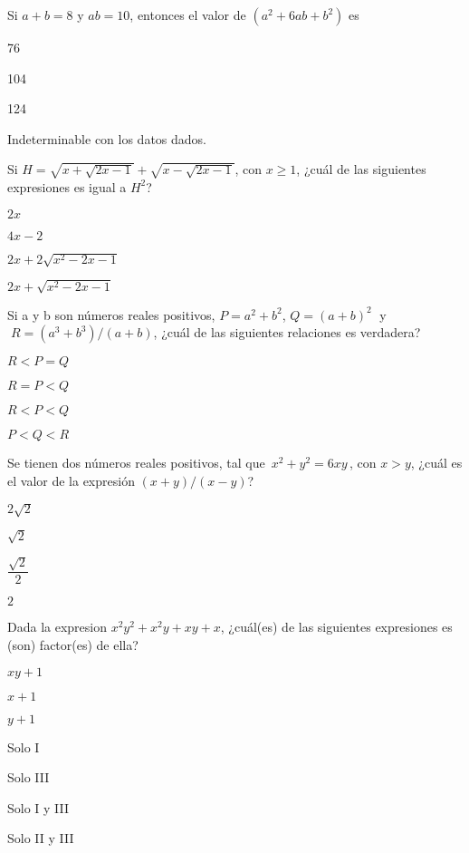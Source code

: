 \documentclass{sn-guia}
\begin{document}
\begin{preguntas}
    \pregunta Si $a+b = 8$ y $ab=10$, entonces el valor de $(a^2 + 6ab + b^2)$ es
    \begin{alternativas}[]
        \item 76
        \item 104
        \item 124
        \item Indeterminable con los datos dados.
    \end{alternativas}

    \pregunta Si $H=\sqrt{x+\sqrt{2x-1}}+\sqrt{x-\sqrt{2x-1}}$, con $x \geq 1$, ¿cuál de las 
    siguientes expresiones es igual a $H^2$?
    \begin{alternativas}[]
        \item $2x$
        \item $4x -2$
        \item $2x + 2\sqrt{x^2-2x-1}$
        \item $2x +\sqrt{x^2-2x-1}$
    \end{alternativas}

    \pregunta Si a y b son números reales positivos, $P=a^2+b^2$, $Q=(a+b)^2\;$ y
    $\;R = (a^3+b^3)/(a+b)$, ¿cuál de las siguientes relaciones es verdadera?
    \begin{alternativas}[]
        \item $R < P = Q$
        \item $R = P < Q$
        \item $R < P < Q$
        \item $P < Q < R$
    \end{alternativas}


    \pregunta Se tienen dos números reales positivos, tal que $\,x^2+y^2=6xy\,$, con $x>y$, 
    ¿cuál es el valor de la expresión $(x+y)/(x-y)$?
    \begin{alternativas}[]
        \item $2\sqrt{2}$
        \item $\sqrt{2}$
        \item $\dfrac{\sqrt{2}}{2}$
        \item $2$
    \end{alternativas} 

    \pregunta Dada la expresion $x^2y^2 + x^2y + xy + x$, ¿cuál(es) de las siguientes 
    expresiones es (son) factor(es) de ella?
    \begin{center} 
    \begin{alternativas*}[label=(\Roman*)]
        \item $xy+1$
        \item $x+1$
        \item $y+1$
    \end{alternativas*}
    \end{center}
    \begin{alternativas}[]
        \item Solo I
        \item Solo III
        \item Solo I y III
        \item Solo II y III
    \end{alternativas}


\end{preguntas}
\end{document}
